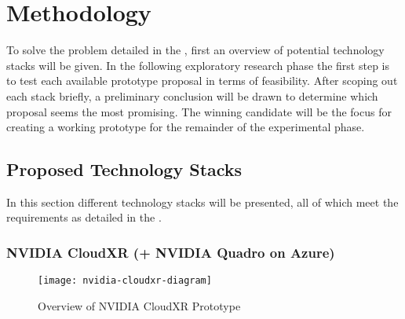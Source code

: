 \section{Methodology}

To solve the problem detailed in the , first an overview of potential technology stacks will be given. In the following exploratory research phase the first step is to test each available prototype proposal in terms of feasibility. After scoping out each stack briefly, a preliminary conclusion will be drawn to determine which proposal seems the most promising. The winning candidate will be the focus for creating a working prototype for the remainder of the experimental phase.

\subsection{Proposed Technology Stacks}
In this section different technology stacks will be presented, all of which meet the requirements as detailed in the .

\subsubsection{NVIDIA CloudXR (+ NVIDIA Quadro on Azure)}
\begin{figure}[h!]
\caption{Overview of NVIDIA CloudXR Prototype \parencite{cloudxr}}
\label{fig:pr0}
\texttt{[image: nvidia-cloudxr-diagram]}
\end{figure}

